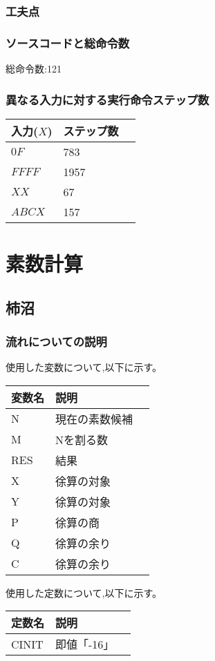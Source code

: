 \documentclass[dvipdfmx,12pt]{jreport}
\begin{document}
\subsubsection{工夫点}

\subsubsection{ソースコードと総命令数}

総命令数:121

\subsubsection{異なる入力に対する実行命令ステップ数}
\begin{table}[h]
  \begin{tabular}{|l|l|l|} \hline
    入力($X$) & ステップ数 \\ \hline
    $0F$ & 783 \\ \hline
    $FFFF$ & 1957 \\ \hline
    $XX$ & 67 \\ \hline
    $ABCX$ & 157 \\ \hline
  \end{tabular}
\end{table}

\section*{素数計算}
\subsection*{柿沼}
\subsubsection*{流れについての説明}
使用した変数について,以下に示す。
\begin{table}[h]
  \begin{tabular}{|l|l|l|} \hline
    変数名 & 説明 \\ \hline
    N & 現在の素数候補 \\ \hline
    M & Nを割る数 \\ \hline
    RES & 結果 \\ \hline
    X & 徐算の対象 \\ \hline
    Y & 徐算の対象 \\ \hline
    P & 徐算の商 \\ \hline
    Q & 徐算の余り \\ \hline
    C & 徐算の余り \\ \hline
  \end{tabular}
\end{table}
使用した定数について,以下に示す。
\begin{table}[h]
  \begin{tabular}{|l|l|l|} \hline
    定数名 & 説明 \\ \hline
    CINIT & 即値「-16」 \\ \hline
  \end{tabular}
\end{table}
\end{document}
